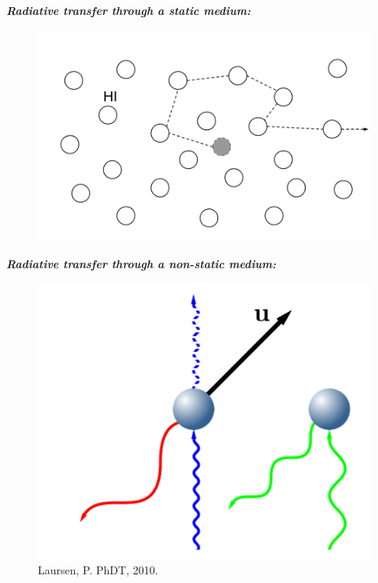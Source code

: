 \documentclass{beamer}
\begin{document}
\begin{frame}{\textit{\textbf{Radiative transfer through a static medium:}}}
\begin{figure}
\includegraphics[scale=0.3]{Figures/RT.png}
\end{figure}
\end{frame}

\begin{frame}{\textit{\textbf{Radiative transfer through a non-static medium:}}}
\begin{figure}
\includegraphics[scale=0.4]{Figures/xshift.png}
\caption*{Laursen, P. PhDT, 2010.}
\end{figure}
\end{frame}
\end{document}
